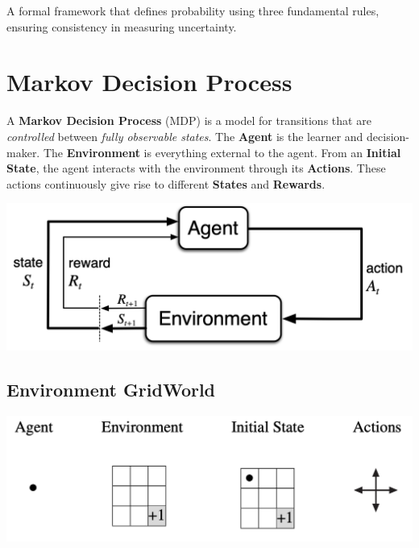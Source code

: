 \documentclass[
  letterpaper,
  DIV=11,
  numbers=noendperiod]{scrreprt}
\begin{document}
\begin{tcolorbox}[enhanced jigsaw, arc=.35mm, toprule=.15mm, leftrule=.75mm, colback=white, left=2mm, colframe=quarto-callout-note-color-frame, rightrule=.15mm, opacityback=0, breakable, bottomrule=.15mm]

A formal framework that defines probability using three fundamental
rules, ensuring consistency in measuring uncertainty. 🎲

\end{tcolorbox}

\section{Markov Decision Process}\label{markov-decision-process}

A \textbf{Markov Decision Process} (MDP) is a model for transitions that
are \emph{controlled} between \emph{fully observable states}. The
\textbf{Agent} is the learner and decision-maker. The
\textbf{Environment} is everything external to the agent. From an
\textbf{Initial State}, the agent interacts with the environment through
its \textbf{Actions}. These actions continuously give rise to different
\textbf{States} and \textbf{Rewards}.

\begin{center}
\includegraphics[width=0.75\linewidth,height=\textheight,keepaspectratio]{lecture4/images/MDP.png}
\end{center}

\subsection{Environment GridWorld}\label{environment-gridworld}

\begin{center}
\includegraphics[width=0.65\linewidth,height=\textheight,keepaspectratio]{lecture4/images/MDPGridworld-ex.png}
\end{center}
\end{document}
